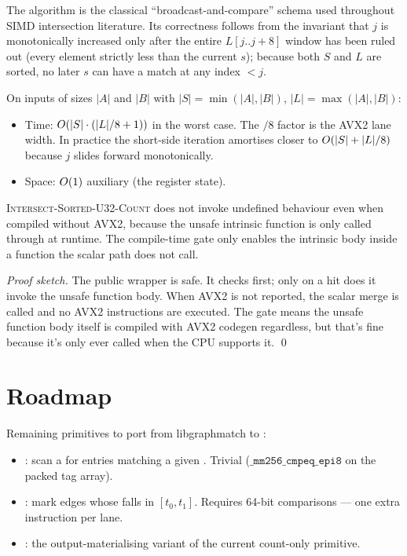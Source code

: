 The algorithm is the classical ``broadcast-and-compare'' schema
used throughout SIMD intersection literature. Its correctness
follows from the invariant that $j$ is monotonically increased
only after the entire $L[j..j+8]$ window has been ruled out (every
element strictly less than the current $s$); because both $S$ and
$L$ are sorted, no later $s$ can have a match at any index $< j$.

\begin{theorem}
On inputs of sizes $|A|$ and $|B|$ with $|S| = \min(|A|, |B|)$,
$|L| = \max(|A|, |B|)$:
\begin{itemize}
    \item Time: $O(|S| \cdot (|L| / 8 + 1))$ in the worst case.
        The $/8$ factor is the AVX2 lane width. In practice the
        short-side iteration amortises closer to $O(|S| + |L| / 8)$
        because $j$ slides forward monotonically.
    \item Space: $O(1)$ auxiliary (the register state).
\end{itemize}
\end{theorem}

\begin{theorem}
\textsc{Intersect-Sorted-U32-Count} does not invoke undefined
behaviour even when compiled without AVX2, because the unsafe
intrinsic function is only called through 
at runtime. The compile-time \code{\#[target\_feature(enable =
"avx2")]} gate only enables the intrinsic body inside a function
the scalar path does not call.
\end{theorem}

\begin{proof}[Proof sketch]
The public wrapper is safe. It checks
 first; only on a hit
does it invoke the unsafe function body. When AVX2 is not reported,
the scalar merge is called and no AVX2 instructions are executed.
The  gate means the unsafe function body
itself is compiled with AVX2 codegen regardless, but that's fine
because it's only ever called when the CPU supports it.
\qed
\end{proof}

\section{Roadmap}

Remaining primitives to port from libgraphmatch to
:
\begin{itemize}
    \item {}: scan a
        \code{\&[CompactRelation]} for entries matching a given
        . Trivial ($\texttt{\_mm256\_cmpeq\_epi8}$
        on the packed tag array).
    \item {}: mark edges whose
         falls in $[t_0, t_1]$. Requires 64-bit
        comparisons --- one extra instruction per lane.
    \item {}: the output-materialising
        variant of the current count-only primitive.
\end{itemize}

